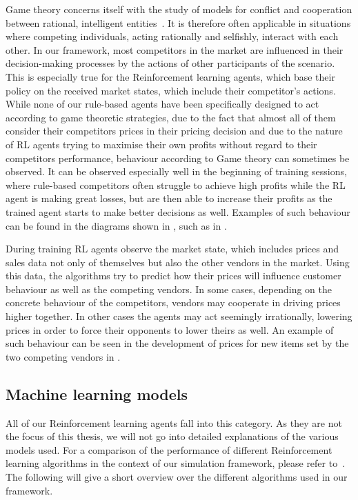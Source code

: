 Game theory concerns itself with the study of models for conflict and cooperation between rational, intelligent entities~\cite{GameTheory}. It is therefore often applicable in situations where competing individuals, acting rationally and selfishly, interact with each other. In our framework, most competitors in the market are influenced in their decision-making processes by the actions of other participants of the scenario. This is especially true for the Reinforcement learning agents, which base their policy on the received market states, which include their competitor's actions. While none of our rule-based agents have been specifically designed to act according to game theoretic strategies, due to the fact that almost all of them consider their competitors prices in their pricing decision and due to the nature of RL agents trying to maximise their own profits without regard to their competitors performance, behaviour according to Game theory can sometimes be observed. It can be observed especially well in the beginning of training sessions, where rule-based competitors often struggle to achieve high profits while the RL agent is making great losses, but are then able to increase their profits as the trained agent starts to make better decisions as well. Examples of such behaviour can be found in the diagrams shown in , such as in .

During training RL agents observe the market state, which includes prices and sales data not only of themselves but also the other vendors in the market. Using this data, the algorithms try to predict how their prices will influence customer behaviour as well as the competing vendors. In some cases, depending on the concrete behaviour of the competitors, vendors may cooperate in driving prices higher together. In other cases the agents may act seemingly irrationally, lowering prices in order to force their opponents to lower theirs as well. An example of such behaviour can be seen in the development of prices for new items set by the two competing vendors in .

\subsection{Machine learning models}\label{subsec:MachineLearningModels}

All of our Reinforcement learning agents fall into this category. As they are not the focus of this thesis, we will not go into detailed explanations of the various models used. For a comparison of the performance of different Reinforcement learning algorithms in the context of our simulation framework, please refer to~\cite{JanThesis}. The following will give a short overview over the different algorithms used in our framework.

